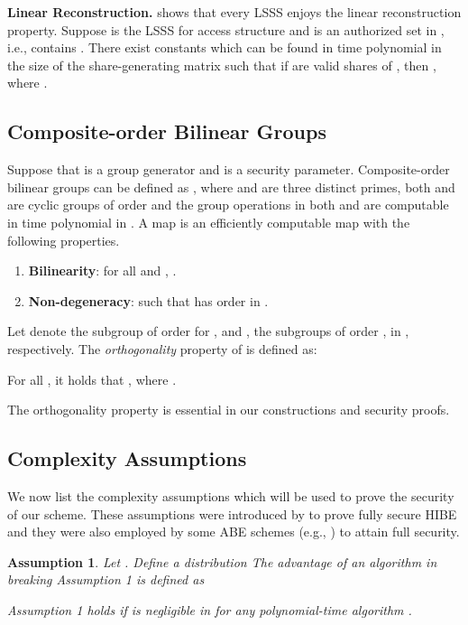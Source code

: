 \documentclass[twocolumn]{svjour3}          \smartqed  \usepackage{graphicx}
\newtheorem{assumption}{Assumption}
\begin{document}
\medskip
\noindent\textbf{Linear Reconstruction.} \cite{Bei96} shows that every LSSS  enjoys the linear reconstruction property. Suppose 
is the LSSS for access structure  and  is an authorized set in , i.e.,  contains . There exist constants
 which can be found in time polynomial in the size of the share-generating matrix  such that if 
are valid shares of , then , where .

\subsection{Composite-order Bilinear Groups}

Suppose that  is a group generator and  is a
security parameter. Composite-order
bilinear groups \cite{BGN05} can be defined as
, where  and  are three distinct primes, both  and
 are cyclic groups of order  and the group operations in both  and  are computable in time polynomial in
. A map  is an efficiently computable map with the following properties.
\begin{enumerate}
  \item \textbf{Bilinearity}: for all  and , .
  \item \textbf{Non-degeneracy}:  such that  has order  in .
\end{enumerate}


Let  denote the subgroup of order  for , and ,  the subgroups of order
,  in , respectively. The \emph{orthogonality} property of  is defined as:
\begin{definition} For
all , it holds that , where .
\end{definition}
The orthogonality property is essential in our
constructions and security proofs.

\subsection{Complexity Assumptions}
We now list the complexity assumptions which will be used to prove the security of our scheme. These assumptions were introduced
by \cite{LW10} to prove fully secure HIBE and
they were also employed by some ABE schemes
(e.g., \cite{LOS+10,LW11}) to attain full security.

\begin{assumption}
Let . Define a distribution
 The advantage of an algorithm  in breaking Assumption 1 is defined as

Assumption 1 holds if  is negligible in  for any polynomial-time algorithm .
\end{assumption}
\end{document}

